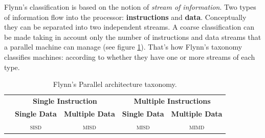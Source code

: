 Flynn's classification is based on the notion of  \textit{stream of information}.
Two types of information flow into the processor: \textbf{instructions} and \textbf{data}.
Conceptually they can be separated into two independent streams. A coarse
classification can be made taking in account only the number of instructions and
 data streams that a parallel machine can manage (see figure \ref{fig:parallelClassification1}).
That's how Flynn's taxonomy classifies machines: according to
whether they have one or more streams of each type.

\begin{table}
		\caption[Flynn's Parallel architecture taxonomy]{Flynn's Parallel architecture taxonomy.}
	\label{fig:parallelClassification1}
	\begin{tabular}{lcccc}\toprule
		&\multicolumn{2}{c}{\textbf{\textsf{Single Instruction}}}&\multicolumn{2}{c}{\textbf{\textsf{Multiple Instructions}}}
		\\\cmidrule(r){2-3}\cmidrule(r){4-5}   
		&\textbf{\textsf{Single Data}}&\textbf{\textsf{Multiple Data}}&\textbf{\textsf{Single Data}}&\textbf{\textsf{Multiple Data}}\\\midrule
		& \textsc{sisd} & \textsc{misd}
		& \textsc{misd} & \textsc{mimd}
		\\\bottomrule
	\end{tabular}

\end{table} 

